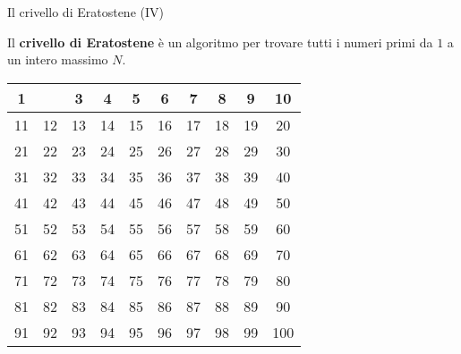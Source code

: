 \begin{frame}{Il crivello di Eratostene (IV)}

  Il \textbf{crivello di Eratostene} è un algoritmo per trovare
  tutti i numeri primi da $1$ a un intero massimo $N$.

  \begin{table}[]
  \centering
    \begin{tabular}{|c|c|c|c|c|c|c|c|c|c|}
    \hline
    \cellcolor[HTML]{C0C0C0}1  & \cellcolor[HTML]{FCFF2F}{\color[HTML]{FE0000} 2} & 3  & 4  & 5  & 6  & 7  & 8  & 9  & 10  \\ \hline
    11                         & 12                        & 13 & 14 & 15 & 16 & 17 & 18 & 19 & 20  \\ \hline
    21                         & 22                        & 23 & 24 & 25 & 26 & 27 & 28 & 29 & 30  \\ \hline
    31                         & 32                        & 33 & 34 & 35 & 36 & 37 & 38 & 39 & 40  \\ \hline
    41                         & 42                        & 43 & 44 & 45 & 46 & 47 & 48 & 49 & 50  \\ \hline
    51                         & 52                        & 53 & 54 & 55 & 56 & 57 & 58 & 59 & 60  \\ \hline
    61                         & 62                        & 63 & 64 & 65 & 66 & 67 & 68 & 69 & 70  \\ \hline
    71                         & 72                        & 73 & 74 & 75 & 76 & 77 & 78 & 79 & 80  \\ \hline
    81                         & 82                        & 83 & 84 & 85 & 86 & 87 & 88 & 89 & 90  \\ \hline
    91                         & 92                        & 93 & 94 & 95 & 96 & 97 & 98 & 99 & 100 \\ \hline
    \end{tabular}
  \end{table}

\end{frame}

